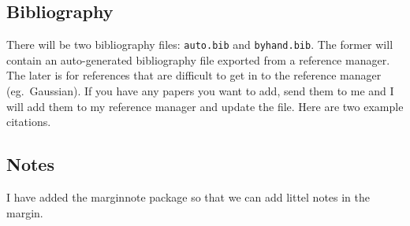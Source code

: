 \subsection{Bibliography}
There will be two bibliography files: \texttt{auto.bib} and \texttt{byhand.bib}.
The former will contain an auto-generated bibliography file exported from a reference manager.
The later is for references that are difficult to get in to the reference manager (eg.~Gaussian).
If you have any papers you want to add, send them to me and I will add them to my reference manager and update the file.
Here are two example citations\cite{jacak_computational_2012,renfrew_incorporation_2012}.

\subsection{Notes}
I have added the \textsf{marginnote} package so that we can add littel notes in the margin.
